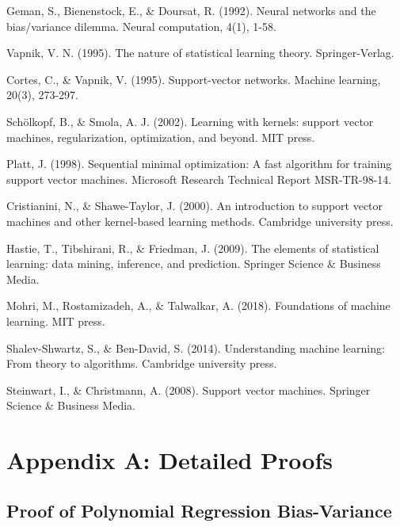 \documentclass[12pt, a4paper]{article}
\begin{document}

\begin{thebibliography}{99}

Geman, S., Bienenstock, E., \& Doursat, R. (1992). Neural networks and the bias/variance dilemma. Neural computation, 4(1), 1-58.

Vapnik, V. N. (1995). The nature of statistical learning theory. Springer-Verlag.

Cortes, C., \& Vapnik, V. (1995). Support-vector networks. Machine learning, 20(3), 273-297.

Schölkopf, B., \& Smola, A. J. (2002). Learning with kernels: support vector machines, regularization, optimization, and beyond. MIT press.

Platt, J. (1998). Sequential minimal optimization: A fast algorithm for training support vector machines. Microsoft Research Technical Report MSR-TR-98-14.

Cristianini, N., \& Shawe-Taylor, J. (2000). An introduction to support vector machines and other kernel-based learning methods. Cambridge university press.

Hastie, T., Tibshirani, R., \& Friedman, J. (2009). The elements of statistical learning: data mining, inference, and prediction. Springer Science \& Business Media.

Mohri, M., Rostamizadeh, A., \& Talwalkar, A. (2018). Foundations of machine learning. MIT press.

Shalev-Shwartz, S., \& Ben-David, S. (2014). Understanding machine learning: From theory to algorithms. Cambridge university press.

Steinwart, I., \& Christmann, A. (2008). Support vector machines. Springer Science \& Business Media.

\end{thebibliography}

\appendix

\section{Appendix A: Detailed Proofs}

\subsection{Proof of Polynomial Regression Bias-Variance}
\end{document}
